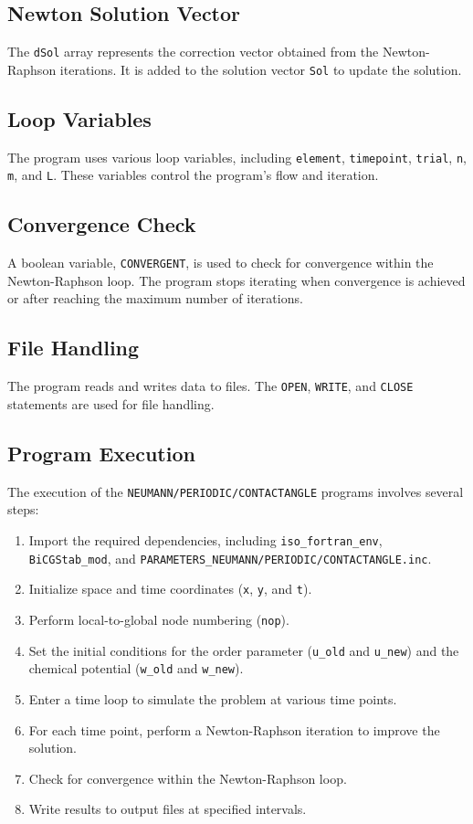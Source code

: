 \documentclass{article}
\begin{document}
\subsection{Newton Solution Vector}
The \texttt{dSol} array represents the correction vector obtained from the Newton-Raphson iterations. It is added to the solution vector \texttt{Sol} to update the solution.

\subsection{Loop Variables}
The program uses various loop variables, including \texttt{element}, \texttt{timepoint}, \texttt{trial}, \texttt{n}, \texttt{m}, and \texttt{L}. These variables control the program's flow and iteration.

\subsection{Convergence Check}
A boolean variable, \texttt{CONVERGENT}, is used to check for convergence within the Newton-Raphson loop. The program stops iterating when convergence is achieved or after reaching the maximum number of iterations.

\subsection{File Handling}
The program reads and writes data to files. The \texttt{OPEN}, \texttt{WRITE}, and \texttt{CLOSE} statements are used for file handling.

\subsection{Program Execution}
The execution of the \texttt{NEUMANN/PERIODIC/CONTACTANGLE} programs involves several steps:

\begin{enumerate}
    \item Import the required dependencies, including \texttt{iso\_fortran\_env}, \texttt{BiCGStab\_mod}, and \texttt{PARAMETERS\_NEUMANN/PERIODIC/CONTACTANGLE.inc}.
    \item Initialize space and time coordinates (\texttt{x}, \texttt{y}, and \texttt{t}).
    \item Perform local-to-global node numbering (\texttt{nop}).
    \item Set the initial conditions for the order parameter (\texttt{u\_old} and \texttt{u\_new}) and the chemical potential (\texttt{w\_old} and \texttt{w\_new}).
    \item Enter a time loop to simulate the problem at various time points.
    \item For each time point, perform a Newton-Raphson iteration to improve the solution.
    \item Check for convergence within the Newton-Raphson loop.
    \item Write results to output files at specified intervals.
\end{enumerate}
\end{document}
